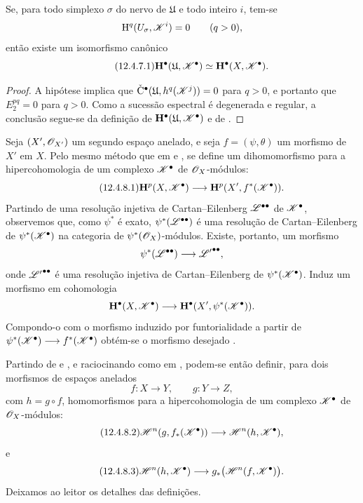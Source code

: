 \begin{corollary}[12.4.7]
\label{0.12.4.7}
Se, para todo simplexo $\sigma$ do nervo de $\mathfrak{U}$ e
todo inteiro $i$, tem-se
\[
  \mathrm{H}^q(U_\sigma,\mathscr{K}^i)=0
  \qquad(q>0),
\]
então existe um isomorfismo canônico
\begin{equation}
\label{0.12.4.7.1}
\tag{12.4.7.1}
  \bb{H}^\bullet(\mathfrak{U},\sh{K}^\bullet)
  \isoto
  \bb{H}^\bullet(X,\sh{K}^\bullet).
\end{equation}
\end{corollary}

\begin{proof}
A hipótese implica que
$\check{\mathrm{C}}^\bullet
(\mathfrak{U},h^q(\mathscr{K}^j))=0$ para $q>0$, e portanto que
$E_2^{pq}=0$ para $q>0$.
Como a sucessão espectral  é degenerada e
regular, a conclusão segue-se da definição
 de
$\mathbf{H}^\bullet(\mathfrak{U},\mathscr{K}^\bullet)$ e de
.
\end{proof}

\begin{env}[12.4.8]
\label{0.12.4.8}
Seja $(X',\mathscr{O}_{X'})$ um segundo espaço anelado, e seja
$f=(\psi,\theta)$ um morfismo de $X'$ em $X$.
Pelo mesmo método que em  e , se
define um dihomomorfismo para a hipercohomologia de um complexo
$\mathscr{K}^\bullet$ de $\mathscr{O}_X$-módulos:
\begin{equation}
\label{0.12.4.8.1}
\tag{12.4.8.1}
  \bb{H}^p(X,\sh{K}^\bullet)
  \longrightarrow
  \bb{H}^p(X',f^*(\sh{K}^\bullet)).
\end{equation}
Partindo de uma resolução injetiva de Cartan--Eilenberg
$\mathscr{L}^{\bullet\bullet}$ de $\mathscr{K}^\bullet$, observemos que, como
$\psi^*$ é exato, $\psi^*(\mathscr{L}^{\bullet\bullet})$ é uma
resolução de Cartan--Eilenberg de $\psi^*(\mathscr{K}^\bullet)$ na
categoria de $\psi^*(\mathscr{O}_X)$-módulos.
Existe, portanto, um morfismo
\[
  \psi^*(\mathscr{L}^{\bullet\bullet})
  \longrightarrow
  {\mathscr{L}'}^{\bullet\bullet},
\]
onde ${\mathscr{L}'}^{\bullet\bullet}$ é uma resolução injetiva de
Cartan--Eilenberg de $\psi^*(\mathscr{K}^\bullet)$.
Induz um morfismo em cohomologia
\[
  \mathbf{H}^\bullet(X,\mathscr{K}^\bullet)
  \longrightarrow
  \mathbf{H}^\bullet
  (X',\psi^*(\mathscr{K}^\bullet)).
\]
Compondo-o com o morfismo induzido por funtorialidade a partir de
$\psi^*(\mathscr{K}^\bullet)\longrightarrow f^*(\mathscr{K}^\bullet)$ obtém-se
o morfismo desejado .

Partindo de  e , e raciocinando como
em , podem-se então definir, para dois morfismos de
espaços anelados
\[
  f:X\longrightarrow Y,
  \qquad
  g:Y\longrightarrow Z,
\]
com $h=g\circ f$, homomorfismos para a hipercohomologia de um complexo
$\mathscr{K}^\bullet$ de $\mathscr{O}_X$-módulos:
\begin{equation}
\label{0.12.4.8.2}
\tag{12.4.8.2}
  \sh{H}^n(g,f_*(\sh{K}^\bullet))
  \longrightarrow
  \sh{H}^n(h,\sh{K}^\bullet),
\end{equation}
e
\begin{equation}
\label{0.12.4.8.3}
\tag{12.4.8.3}
  \sh{H}^n(h,\sh{K}^\bullet)
  \longrightarrow
  g_*\bigl(\sh{H}^n(f,\sh{K}^\bullet)\bigr).
\end{equation}
Deixamos ao leitor os detalhes das definições.
\end{env}
